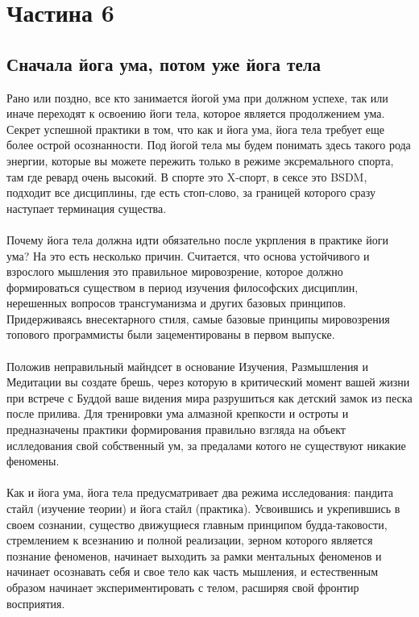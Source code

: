 \section{Частина 6}

\subsection{Сначала йога ума, потом уже йога тела}

Рано или поздно, все кто занимается йогой ума при должном успехе, так или иначе переходят к освоению йоги тела, которое является продолжением ума. Секрет успешной практики в том, что как и йога ума, йога тела требует еще более острой осознанности. Под йогой тела мы будем понимать здесь такого рода энергии, которые вы можете пережить только в режиме эксремального спорта, там где ревард очень высокий. В спорте   это X-спорт, в сексе   это BSDM, подходит все дисциплины, где есть стоп-слово, за границей которого сразу наступает терминация существа.
\\
\\
Почему йога тела должна идти обязательно после укрпления в практике йоги ума? На это есть несколько причин. Считается, что основа устойчивого и взрослого мышления   это правильное мировозрение, которое должно формироваться существом в период изучения философских дисциплин, нерешенных вопросов трансгуманизма и других базовых принципов. Придерживаясь внесектарного стиля, самые базовые принципы мировозрения топового программисты были зацементированы в первом выпуске.
\\
\\
Положив неправильный майндсет в основание Изучения, Размышления и Медитации вы создате брешь, через которую в критический момент вашей жизни при встрече с Буддой ваше видения мира разрушиться как детский замок из песка после прилива. Для тренировки ума алмазной крепкости и остроты и предназначены практики формирования правильно взгляда на объект ислледования   свой собственный ум, за предалами котого не существуют никакие феномены.
\\
\\
Как и йога ума, йога тела предусматривает два режима исследования: пандита стайл (изучение теории) и йога стайл (практика). Усвоившись и укрепившись в своем сознании, существо движущиеся главным принципом будда-таковости, стремлением к всезнанию и полной реализации, зерном которого является познание феноменов, начинает выходить за рамки ментальных феноменов и начинает осознавать себя и свое тело как часть мышления, и естественным образом начинает экспериментировать с телом, расширяя свой фронтир восприятия.
